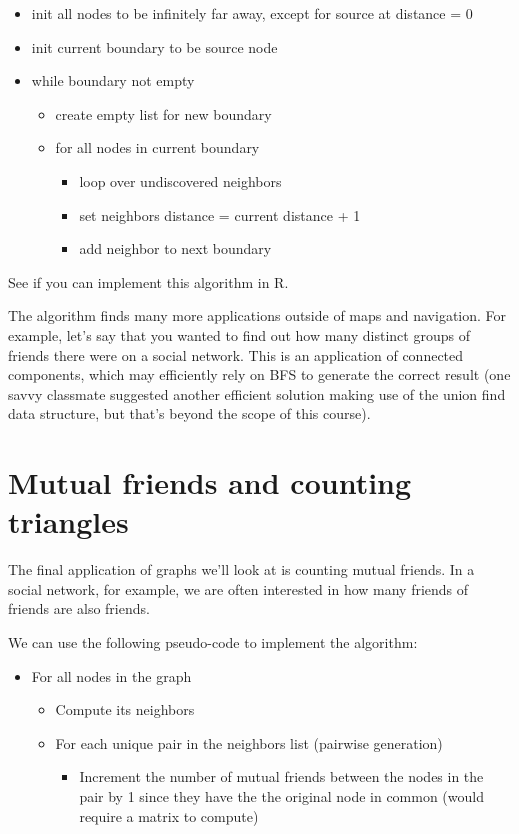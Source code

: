 \begin{itemize}
    \item init all nodes to be infinitely far away, except for source at distance = 0
    \item init current boundary to be source node
    \item while boundary not empty
    \begin{itemize}
        \item create empty list for new boundary
        \item for all nodes in current boundary
        \begin{itemize}
            \item loop over undiscovered neighbors
            \item set neighbors distance = current distance + 1
            \item add neighbor to next boundary
        \end{itemize}
    \end{itemize}
\end{itemize}

See if you can implement this algorithm in R.

The algorithm finds many more applications outside of maps and navigation. For example, let's say that you wanted to find out how many distinct groups of friends there were on a social network. This is an application of connected components, which may efficiently rely on BFS to generate the correct result (one savvy classmate suggested another efficient solution making use of the union find data structure, but that's beyond the scope of this course).

\section{Mutual friends and counting triangles}

The final application of graphs we'll look at is counting mutual friends. In a social network, for example, we are often interested in how many friends of friends are also friends.

We can use the following pseudo-code to implement the algorithm:

\begin{itemize}
    \item For all nodes in the graph
    \begin{itemize}
        \item Compute its neighbors
        \item For each unique pair in the neighbors list (pairwise generation)
        \begin{itemize}
            \item Increment the number of mutual friends between the nodes in the pair by 1 since they have the the original node in common (would require a matrix to compute)
        \end{itemize}
    \end{itemize}
\end{itemize}

